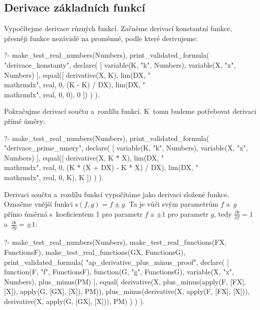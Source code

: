 \subsection{Derivace základních funkcí}
\label{sec:derivace_zakladnich_funkci}

Vypočítejme derivace různých funkcí. Začněme derivací konstantní funkce, přesněji funkce nezávislé na proměnné, podle které derivujeme:

\begin{prolog}
?-	make_test_real_numbers(Numbers),
	print_validated_formula(
		"derivace_konstanty",
		declare(	
			[
				variable(K, "k", Numbers),
				variable(X, "x", Numbers)
			],
			equal([
				derivative(X, K),
				lim(DX, "\\mathrm{d}x", real, 0, (K - K) / DX),
				lim(DX, "\\mathrm{d}x", real, 0, 0),
				0
			])
		)
	).
\end{prolog}

Pokračujme derivací součtu a~rozdílu funkcí. K~tomu budeme potřebovat derivaci přímé úměry:

\begin{prolog}
?-	make_test_real_numbers(Numbers),
	print_validated_formula(
		"derivace_prime_umery",
		declare(	
			[
				variable(K, "k", Numbers),
				variable(X, "x", Numbers)
			],
			equal([
				derivative(X, K * X),
				lim(DX, "\\mathrm{d}x", real, 0, (K * (X + DX) - K * X) / DX),
				lim(DX, "\\mathrm{d}x", real, 0, K),
				K
			])
		)
	).
\end{prolog}

Derivaci součtu a~rozdílu funkcí vypočítáme jako derivaci složené funkce. Označme vnější funkci \(\mathrm{s}(f, g) = f \pm g\). Ta je vůči svým parametrům \(f\) a~\(g\) přímo úměrná s~koeficientem 1 pro parametr \(f\) a \(\pm1\) pro parametr \(g\), tedy \(\frac{\partial \mathrm{s}}{\partial f} = 1\) a~\(\frac{\partial \mathrm{s}}{\partial g} = \pm1\):

\begin{prolog}
?-	make_test_real_numbers(Numbers),
	make_test_real_functions(FX, FunctionsF),
	make_test_real_functions(GX, FunctionsG),
	print_validated_formula(
		"ap_derivative_plus_minus_proof",
		declare(
			[
				function(F, "f", FunctionsF),
				function(G, "g", FunctionsG),
				variable(X, "x", Numbers),
				plus_minus(PM)  
			],
			equal(
				derivative(X, plus_minus(apply(F, [FX], [X]), apply(G, [GX], [X]), PM)),
				plus_minus(derivative(X, apply(F, [FX], [X])), derivative(X, apply(G, [GX], [X])), PM)
			)
		)
	).
\end{prolog}


